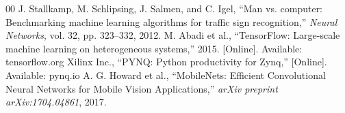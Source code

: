 \documentclass[conference]{IEEEtran}
\begin{document}
\begin{thebibliography}{00}
 J. Stallkamp, M. Schlipsing, J. Salmen, and C. Igel, ``Man vs. computer: Benchmarking machine learning algorithms for traffic sign recognition,'' \textit{Neural Networks}, vol. 32, pp. 323--332, 2012.
 M. Abadi et al., ``TensorFlow: Large-scale machine learning on heterogeneous systems,'' 2015. [Online]. Available: tensorflow.org
 Xilinx Inc., ``PYNQ: Python productivity for Zynq,'' [Online]. Available: pynq.io
 A. G. Howard et al., ``MobileNets: Efficient Convolutional Neural Networks for Mobile Vision Applications,'' \textit{arXiv preprint arXiv:1704.04861}, 2017.
\end{thebibliography}
\end{document}
